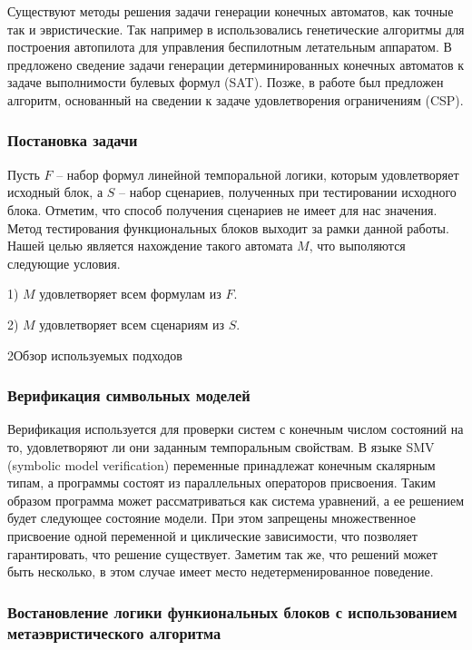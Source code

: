 \documentclass[14pt]{extarticle}
\makeatletter
\theoremstyle{plain}
\theoremstyle{definition}
\renewcommand{\subsection}{\@startsection{subsection}{2}{0mm}%
{2\baselineskip}{\baselineskip}{\bfseries\large\itshape}}
\makeatother
\begin{document}
Существуют методы решения задачи генерации конечных автоматов,
как точные так и эвристические. Так например в \cite{ps, ask} использовались
генетические алгоритмы для построения автопилота для управления беспилотным
летательным аппаратом. В \cite{sat} предложено сведение задачи генерации детерминированных конечных автоматов
к задаче выполнимости булевых формул (SAT). Позже, в работе \cite{csp} был предложен алгоритм, основанный на сведении к задаче
удовлетворения ограничениям (CSP).

\subsubsection{Постановка задачи}

Пусть $F$ -- набор формул линейной темпоральной логики, которым удовлетворяет
исходный блок, а $S$ -- набор сценариев, полученных при тестировании исходного
блока. Отметим, что способ получения сценариев не имеет для нас значения. Метод тестирования
функциональных блоков выходит за рамки данной работы. Нашей целью является нахождение такого автомата $M$, что
выполяются следующие условия.

1) $M$ удовлетворяет всем формулам из $F$.

2) $M$ удовлетворяет всем сценариям из $S$.

\subsection{Обзор используемых подходов}
\subsubsection{Верификация символьных моделей}

Верификация используется для проверки систем с
конечным числом состояний на то, удовлетворяют ли они заданным темпоральным
свойствам. В языке SMV (symbolic model verification) переменные принадлежат конечным скалярным типам, а
программы состоят из параллельных операторов присвоения. Таким образом
программа может рассматриваться как система уравнений, а ее решением будет
следующее состояние модели. При этом запрещены множественное присвоение одной
переменной и циклические зависимости, что позволяет гарантировать, что решение
существует. Заметим так же, что решений может быть несколько, в этом случае имеет
место недетерменированное поведение.

\subsubsection{Востановление логики функиональных блоков с использованием
метаэвристического алгоритма}
\end{document}
